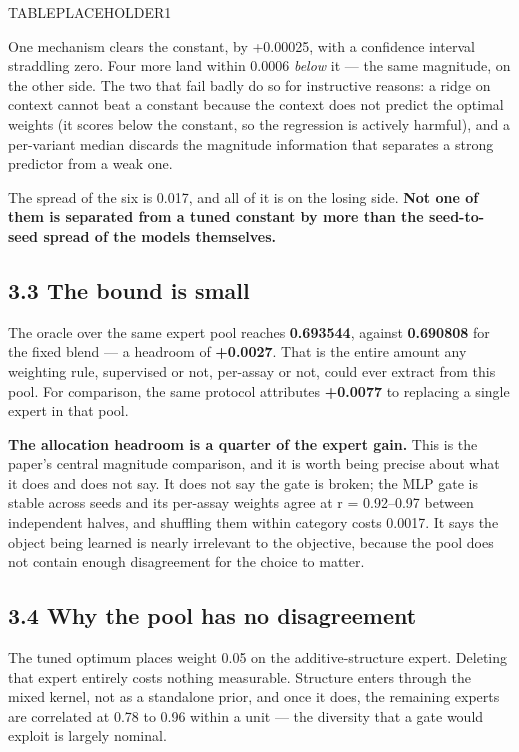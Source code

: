 TABLEPLACEHOLDER1

One mechanism clears the constant, by +0.00025, with a confidence interval straddling zero. Four more
land within 0.0006 \emph{below} it --- the same magnitude, on the other side. The two that fail badly do so for
instructive reasons: a ridge on context cannot beat a constant because the context does not predict the
optimal weights (it scores below the constant, so the regression is actively harmful), and a per-variant
median discards the magnitude information that separates a strong predictor from a weak one.

The spread of the six is 0.017, and all of it is on the losing side. \textbf{Not one of them is separated from
a tuned constant by more than the seed-to-seed spread of the models themselves.}

\hypertarget{the-bound-is-small}{%
\subsection{3.3 The bound is small}\label{the-bound-is-small}}

The oracle over the same expert pool reaches \textbf{0.693544}, against \textbf{0.690808} for the fixed blend --- a
headroom of \textbf{+0.0027}. That is the entire amount any weighting rule, supervised or not, per-assay or
not, could ever extract from this pool. For comparison, the same protocol attributes \textbf{+0.0077} to
replacing a single expert in that pool.

\textbf{The allocation headroom is a quarter of the expert gain.} This is the paper's central magnitude
comparison, and it is worth being precise about what it does and does not say. It does not say the gate
is broken; the MLP gate is stable across seeds and its per-assay weights agree at r = 0.92--0.97 between
independent halves, and shuffling them within category costs 0.0017. It says the object being learned
is nearly irrelevant to the objective, because the pool does not contain enough disagreement for the
choice to matter.

\hypertarget{why-the-pool-has-no-disagreement}{%
\subsection{3.4 Why the pool has no disagreement}\label{why-the-pool-has-no-disagreement}}

The tuned optimum places weight 0.05 on the additive-structure expert. Deleting that expert entirely
costs nothing measurable. Structure enters through the mixed kernel, not as a standalone prior, and once
it does, the remaining experts are correlated at 0.78 to 0.96 within a unit --- the diversity that a gate
would exploit is largely nominal.

